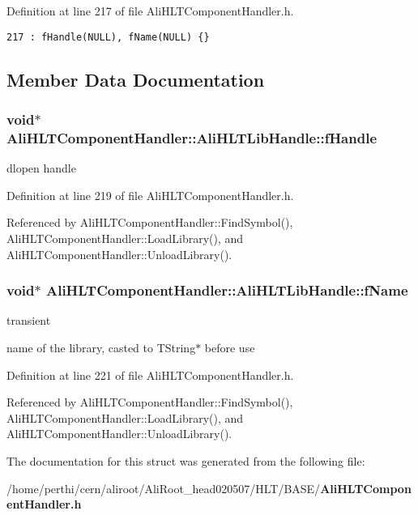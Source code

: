 Definition at line 217 of file Ali\-HLTComponent\-Handler.h.

\footnotesize\begin{verbatim}217 : fHandle(NULL), fName(NULL) {}
\end{verbatim}\normalsize 




\subsection{Member Data Documentation}
\subsubsection{\setlength{\rightskip}{0pt plus 5cm}void$\ast$ {\bf Ali\-HLTComponent\-Handler::Ali\-HLTLib\-Handle::f\-Handle}}\label{structAliHLTComponentHandler_1_1AliHLTLibHandle_o0}


dlopen handle 

Definition at line 219 of file Ali\-HLTComponent\-Handler.h.

Referenced by Ali\-HLTComponent\-Handler::Find\-Symbol(), Ali\-HLTComponent\-Handler::Load\-Library(), and Ali\-HLTComponent\-Handler::Unload\-Library().
\subsubsection{\setlength{\rightskip}{0pt plus 5cm}void$\ast$ {\bf Ali\-HLTComponent\-Handler::Ali\-HLTLib\-Handle::f\-Name}}\label{structAliHLTComponentHandler_1_1AliHLTLibHandle_o1}


transient 

name of the library, casted to TString$\ast$ before use 

Definition at line 221 of file Ali\-HLTComponent\-Handler.h.

Referenced by Ali\-HLTComponent\-Handler::Find\-Symbol(), Ali\-HLTComponent\-Handler::Load\-Library(), and Ali\-HLTComponent\-Handler::Unload\-Library().

The documentation for this struct was generated from the following file:\begin{CompactItemize}
\item 
/home/perthi/cern/aliroot/Ali\-Root\_\-head020507/HLT/BASE/{\bf Ali\-HLTComponent\-Handler.h}\end{CompactItemize}
